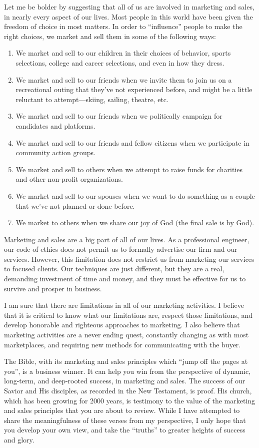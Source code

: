 \documentclass[12pt]{memoir}
\begin{document}
Let me be bolder by suggesting that all of us are involved in marketing
and sales, in nearly every aspect of our lives. Most people in this
world have been given the freedom of choice in most matters. In order
to ``influence'' people to make the right choices, we market and
sell them in some of the following ways:
\begin{enumerate}
\item We market and sell to our children in their choices of behavior, sports
selections, college and career selections, and even in how they dress. 
\item We market and sell to our friends when we invite them to join us on
a recreational outing that they've not experienced before, and might
be a little reluctant to attempt---skiing, sailing, theatre, etc. 
\item We market and sell to our friends when we politically campaign for
candidates and platforms. 
\item We market and sell to our friends and fellow citizens when we participate
in community action groups. 
\item We market and sell to others when we attempt to raise funds for charities
and other non-profit organizations. 
\item We market and sell to our spouses when we want to do something as
a couple that we've not planned or done before. 
\item We market to others when we share our joy of God (the final sale is
by God).
\end{enumerate}
Marketing and sales are a big part of all of our lives. As a professional
engineer, our code of ethics does not permit us to formally advertise
our firm and our services. However, this limitation does not restrict
us from marketing our services to focused clients. Our techniques
are just different, but they are a real, demanding investment of time
and money, and they must be effective for us to survive and prosper
in business.

I am sure that there are limitations in all of our marketing activities.
I believe that it is critical to know what our limitations are, respect
those limitations, and develop honorable and righteous approaches
to marketing. I also believe that marketing activities are a never
ending quest, constantly changing as with most marketplaces, and requiring
new methods for communicating with the buyer.

The Bible, with its marketing and sales principles which ``jump off
the pages at you'', is a business winner. It can help you win from
the perspective of dynamic, long-term, and deep-rooted success, in
marketing and sales. The success of our Savior and His disciples,
as recorded in the New Testament, is proof. His church, which has
been growing for 2000 years, is testimony to the value of the marketing
and sales principles that you are about to review. While I have attempted
to share the meaningfulness of these verses from my perspective, I
only hope that you develop your own view, and take the ``truths''
to greater heights of success and glory.
\end{document}
